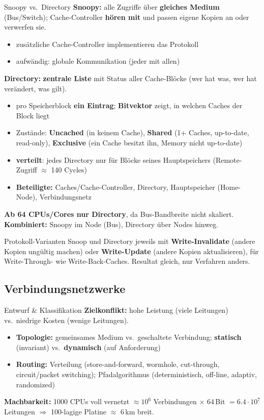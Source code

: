 \documentclass[a4paper, fontsize=7pt]{scrartcl}
\begin{document}
\begin{mainbox}{Snoopy vs.\ Directory}
\textbf{Snoopy:} alle Zugriffe über \textbf{gleiches Medium} (Bus/Switch);
Cache-Controller \textbf{hören mit} und passen eigene Kopien an oder verwerfen
sie.
\begin{itemize}
    \item zusätzliche Cache-Controller implementieren das Protokoll
    \item aufwändig: globale Kommunikation (jeder mit allen)
\end{itemize}
\textbf{Directory:} \textbf{zentrale Liste} mit Status aller Cache-Blöcke
(wer hat was, wer hat verändert, was gilt).
\begin{itemize}
    \item pro Speicherblock \textbf{ein Eintrag}; \textbf{Bitvektor} zeigt,
          in welchen Caches der Block liegt
    \item Zustände: \textbf{Uncached} (in keinem Cache), \textbf{Shared}
          (1+ Caches, up-to-date, read-only), \textbf{Exclusive} (ein Cache
          besitzt ihn, Memory nicht up-to-date)
    \item \textbf{verteilt}: jedes Directory nur für Blöcke seines
          Hauptspeichers (Remote-Zugriff $\approx$ 140 Cycles)
    \item \textbf{Beteiligte:} Caches/Cache-Controller, Directory, Hauptspeicher
          (Home-Node), Verbindungsnetz
\end{itemize}
\textbf{Ab 64 CPUs/Cores nur Directory}, da Bus-Bandbreite nicht skaliert.
\textbf{Kombiniert:} Snoopy im Node (Bus), Directory über Nodes hinweg.
\end{mainbox}

\begin{subbox}{Protokoll-Varianten}
Snoop und Directory jeweils mit \textbf{Write-Invalidate} (andere Kopien
ungültig machen) oder \textbf{Write-Update} (andere Kopien aktualisieren),
für Write-Through- wie Write-Back-Caches. Resultat gleich, nur Verfahren
anders.
\end{subbox}

\subsection{Verbindungsnetzwerke}

\begin{mainbox}{Entwurf \& Klassifikation}
\textbf{Zielkonflikt:} hohe Leistung (viele Leitungen) vs.\ niedrige Kosten
(wenige Leitungen).
\begin{itemize}
    \item \textbf{Topologie:} gemeinsames Medium vs.\ geschaltete Verbindung;
          \textbf{statisch} (invariant) vs.\ \textbf{dynamisch} (auf
          Anforderung)
    \item \textbf{Routing:} Verteilung (store-and-forward, wormhole,
          cut-through, circuit/packet switching); Pfadalgorithmus
          (deterministisch, off-line, adaptiv, randomized)
\end{itemize}
\textbf{Machbarkeit:} 1000 CPUs voll vernetzt $\approx 10^6$ Verbindungen
$\times$ 64\,Bit $= 6.4\cdot 10^7$ Leitungen $\Rightarrow$ 100-lagige
Platine $\approx$ 6\,km breit.
\end{mainbox}
\end{document}
